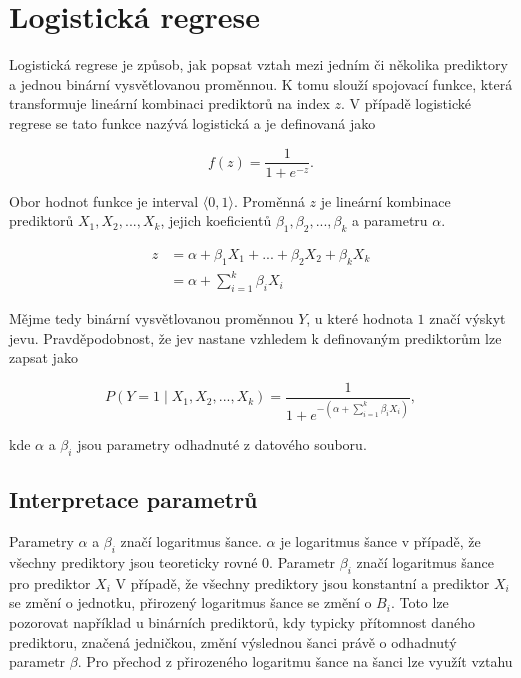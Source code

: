 \newpage
\section{Logistická regrese}
Logistická regrese je způsob, jak popsat vztah mezi jedním či několika prediktory a jednou binární vysvětlovanou 
proměnnou. K tomu slouží spojovací funkce, která transformuje lineární kombinaci prediktorů na index $z$. V případě
logistické regrese se tato funkce nazývá logistická a je definovaná jako

\begin{equation}
    \label{eq:logisticka_funkce}
    f(z) = \frac{1}{1 + e^{-z}}.
\end{equation}

Obor hodnot funkce je interval $\langle 0, 1 \rangle$. Proměnná $z$ je lineární kombinace prediktorů  $X_1, X_2, ..., X_k$, 
jejich koeficientů $\beta_1, \beta_2, ..., \beta_k$ a parametru $\alpha$.

\begin{equation}
    \label{eq:linearni_kombinace_z}
    \begin{split}
        z &= \alpha + \beta_1 X_1 + ... + \beta_2 X_2 +\beta_k X_k \\
          &= \alpha + \sum_{i=1}^k \beta_i X_i
    \end{split}
\end{equation}

Mějme tedy binární vysvětlovanou proměnnou $Y$, u které hodnota $1$ značí výskyt jevu. Pravděpodobnost, že jev nastane
vzhledem k definovaným prediktorům lze zapsat jako

\begin{equation}
    \label{eq:pravdepodobnost_y}
    P(Y = 1 \mid X_1, X_2, ..., X_k) = \frac{1}{1 + e^{- \left( \alpha + \sum_{i=1}^k \beta_i X_i \right) }},
\end{equation}

kde $\alpha$ a $\beta_i$ jsou parametry odhadnuté z datového souboru. \cite{kleinbaum_logistic_2010}

\subsection{Interpretace parametrů}
Parametry $\alpha$ a $\beta_i$ značí logaritmus šance. $\alpha$ je logaritmus šance v případě, že všechny prediktory
jsou teoreticky rovné $0$. Parametr $\beta_i$ značí logaritmus šance pro prediktor $X_i$
V případě, že všechny prediktory jsou konstantní a prediktor $X_i$ se změní o jednotku, přirozený logaritmus
šance se změní o $B_i$. Toto lze pozorovat například u binárních prediktorů, kdy typicky přítomnost
daného prediktoru, značená jedničkou, změní výslednou šanci právě o odhadnutý parametr $\beta$.
Pro přechod z přirozeného logaritmu šance na šanci lze využít vztahu

